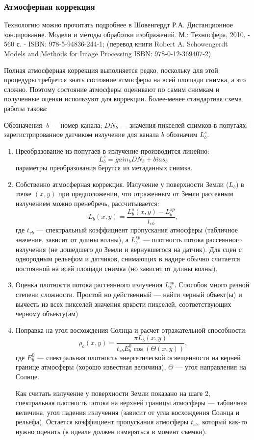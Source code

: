 \begin{frame}[allowframebreaks]
    \frametitle{Атмосферная коррекция}
    Технологию можно прочитать подробнее в Шовенгердт Р.А. Дистанционное зондирование. Модели и методы обработки изображений. М.: Техносфера, 2010. - 560 с. - ISBN: 978-5-94836-244-1; (перевод книги Robert A. Schowengerdt Models and Methods for Image Processing ISBN: 978-0-12-369407-2)

    Полная атмосферная коррекция выполняется редко, поскольку для этой процедуры требуется знать состояние атмосферы на всей площади снимка, а это сложно. Поэтому состояние атмосферы оценивают по самим снимкам и полученные оценки используют для коррекции. Более-менее стандартная схема работы такова:

Обозначения: $b$ --- номер канала; $DN_b$ --- значения пикселей снимков в попугаях; зарегистрированное датчиком излучение для канала $b$ обозначим $L^s_b$.
\begin{enumerate}
    \item Преобразование из попугаев в излучение производится линейно:
    $$L^s_b = gain_bDN_b +bias_b$$
    параметры преобразования берутся из метаданных снимка.
    \item Собственно атмосферная коррекция. Излучение у поверхности Земли ($L_b$) в точке $(x,y)$ при предположении, что отраженным от Земли рассеяным излучением можно пренебречь, рассчитывается:
    $$L_b(x,y) = \frac{L^s_b(x,y) - L_b^{sp}}{t_{vb}},$$
    где $t_{vb}$ --- спектральный коэффициент пропускания атмосферы (табличное значение, зависит от длины волны), а $L^{sp}_b$ --- плотность потока рассеянного излучения (не дошедшего до Земли и вернувшегося на датчик). Для сцен с однородным рельефом и датчиков, снимающих в надире обычно считается постоянной на всей площади снимка (но зависит от длины волны).
    \item Оценка плотности потока рассеянного излучения $L^{sp}_b$. Способов много разной степени сложности. Простой но действенный --- найти черный объект(ы) и вычесть из всех пикселей значения яркости пикселей, соответствующих черному объекту(ам)
    \item Поправка на угол восхождения Солнца и расчет отражательной способности:
    $$\rho_b(x,y) = \frac{\pi L_b(x,y)} {t_{sb}E^0_b\cos(\Theta(x,y))},$$
    где $E^0_b$ --- спектральная плотность энергетической освещенности на верней границе атмосферы (хорошо известная величина), $\Theta$ --- угол направления на Солнце.

    Как считать излучение у поверхности Земли показано на шаге 2, спектральная плотность потока на верхней границы атмосферы --- табличная величина, угол падения излучения (зависит от угла восхождения Солнца и рельефа). Остается коэффициент пропускания атмосферы $t_{sb}$, который как-то нужно оценить (в идеале должен измеряться в момент съемки).
\end{enumerate}

\end{frame}

